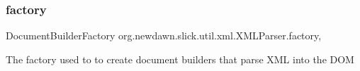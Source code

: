 \subsubsection{\texorpdfstring{factory}{factory}}
{\footnotesize\ttfamily Document\+Builder\+Factory org.\+newdawn.\+slick.\+util.\+xml.\+X\+M\+L\+Parser.\+factory\hspace{0.3cm}{\ttfamily [static]}, {\ttfamily [private]}}

The factory used to to create document builders that parse X\+ML into the D\+OM 